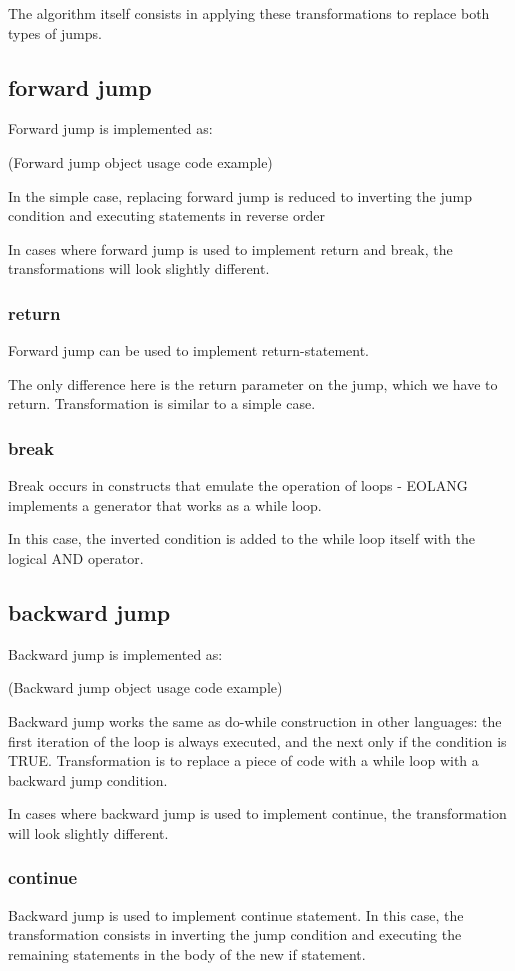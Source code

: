\documentclass[two column]{article}
\begin{document}
The algorithm itself consists in applying these transformations to replace both types of jumps.

\subsection{forward jump}
Forward jump is implemented as:

(Forward jump object usage code example)

In the simple case, replacing forward jump is reduced to inverting the jump condition and executing statements in reverse order

In cases where forward jump is used to implement return and break, the transformations will look slightly different.

\subsubsection{return}
Forward jump can be used to implement return-statement.

The only difference here is the return parameter on the jump, which we have to return. Transformation is similar to a simple case.

\subsubsection{break}
Break occurs in constructs that emulate the operation of loops - EOLANG implements a generator that works as a while loop.

In this case, the inverted condition is added to the while loop itself with the logical AND operator.

\subsection{backward jump}
Backward jump is implemented as:

(Backward jump object usage code example)

Backward jump works the same as do-while construction in other languages: the first iteration of the loop is always executed, and the next only if the condition is TRUE.
Transformation is to replace a piece of code with a while loop with a backward jump condition.

In cases where backward jump is used to implement continue, the transformation will look slightly different.

\subsubsection{continue}
Backward jump is used to implement continue statement. In this case, the transformation consists in inverting the jump condition and executing the remaining statements in the body of the new if statement.
\end{document}
